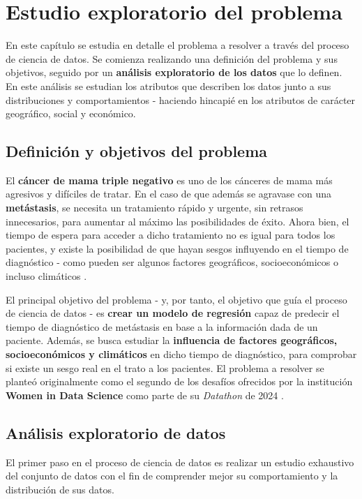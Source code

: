 \chapter{Estudio exploratorio del problema}

En este capítulo se estudia en detalle el problema a resolver a través del proceso de ciencia de datos. Se comienza realizando una definición del problema y sus objetivos, seguido por un \textbf{análisis exploratorio de los datos} que lo definen. En este análisis se estudian los atributos que describen los datos junto a sus distribuciones y comportamientos - haciendo hincapié en los atributos de carácter geográfico, social y económico.

\section{Definición y objetivos del problema}

El \textbf{cáncer de mama triple negativo} es uno de los cánceres de mama más agresivos y difíciles de tratar. En el caso de que además se agravase con una \textbf{metástasis}, se necesita un tratamiento rápido y urgente, sin retrasos innecesarios, para aumentar al máximo las posibilidades de éxito. Ahora bien, el tiempo de espera para acceder a dicho tratamiento no es igual para todos los pacientes, y existe la posibilidad de que hayan sesgos influyendo en el tiempo de diagnóstico - como pueden ser algunos factores geográficos, socioeconómicos o incluso climáticos \cite{widsdatathon2024-challenge2}.

El principal objetivo del problema - y, por tanto, el objetivo que guía el proceso de ciencia de datos - es \textbf{crear un modelo de regresión} capaz de predecir el tiempo de diagnóstico de metástasis en base a la información dada de un paciente. Además, se busca estudiar la \textbf{influencia de factores geográficos, socioeconómicos y climáticos} en dicho tiempo de diagnóstico, para comprobar si existe un sesgo real en el trato a los pacientes.
El problema a resolver se planteó originalmente como el segundo de los desafíos ofrecidos por la institución \textbf{Women in Data Science} como parte de su \textit{Datathon} de 2024 \cite{widsdatathon2024-challenge2}.

\section{Análisis exploratorio de datos}

El primer paso en el proceso de ciencia de datos es realizar un estudio exhaustivo del conjunto de datos con el fin de comprender mejor su comportamiento y la distribución de sus datos.

